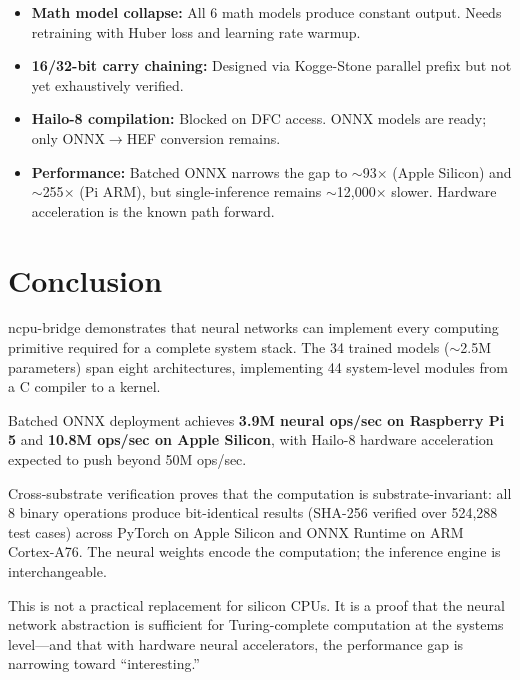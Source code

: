 \documentclass[11pt,a4paper]{article}
\begin{document}
\begin{itemize}[itemsep=4pt]
    \item \textbf{Math model collapse:} All 6 math models produce constant output. Needs retraining with Huber loss and learning rate warmup.
    \item \textbf{16/32-bit carry chaining:} Designed via Kogge-Stone parallel prefix but not yet exhaustively verified.
    \item \textbf{Hailo-8 compilation:} Blocked on DFC access. ONNX models are ready; only ONNX$\to$HEF conversion remains.
    \item \textbf{Performance:} Batched ONNX narrows the gap to ${\sim}$93$\times$ (Apple Silicon) and ${\sim}$255$\times$ (Pi ARM), but single-inference remains ${\sim}$12,000$\times$ slower. Hardware acceleration is the known path forward.
\end{itemize}

\section{Conclusion}

ncpu-bridge demonstrates that neural networks can implement every computing primitive required for a complete system stack. The 34 trained models (${\sim}$2.5M parameters) span eight architectures, implementing 44 system-level modules from a C compiler to a kernel.

Batched ONNX deployment achieves \textbf{3.9M neural ops/sec on Raspberry Pi 5} and \textbf{10.8M ops/sec on Apple Silicon}, with Hailo-8 hardware acceleration expected to push beyond 50M ops/sec.

Cross-substrate verification proves that the computation is substrate-invariant: all 8 binary operations produce bit-identical results (SHA-256 verified over 524,288 test cases) across PyTorch on Apple Silicon and ONNX Runtime on ARM Cortex-A76. The neural weights encode the computation; the inference engine is interchangeable.

This is not a practical replacement for silicon CPUs. It is a proof that the neural network abstraction is sufficient for Turing-complete computation at the systems level---and that with hardware neural accelerators, the performance gap is narrowing toward ``interesting.''
\end{document}

